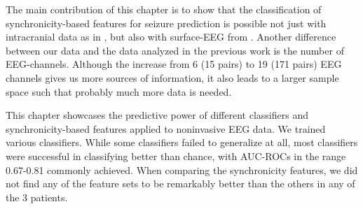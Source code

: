 The main contribution of this chapter is to show that the classification of synchronicity-based features for seizure prediction is possible not just with intracranial data as in \cite{mirowski2009classification}, but also with surface-EEG from \citet{ihle2012epilepsiae}. Another difference between our data and the data analyzed in the previous work is the number of EEG-channels. Although the increase from 6 (15 pairs) to 19 (171 pairs) EEG channels gives us more sources of information, it also leads to a larger sample space such that probably much more data is needed.

This chapter showcases the predictive power of different classifiers and synchronicity-based features applied to noninvasive EEG data. We trained various classifiers. While some classifiers failed to generalize at all, most classifiers were successful in classifying better than chance, with AUC-ROCs in the range 0.67-0.81 commonly achieved. When comparing the synchronicity features, we did not find any of the feature sets to be remarkably better than the others in any of the 3 patients. 







